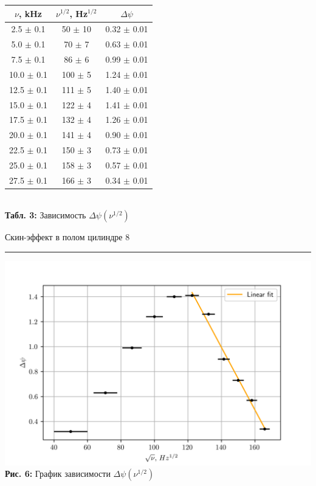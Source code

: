 \documentclass[12pt,a4paper]{scrartcl}
\begin{document}
	\begin{center}
		\begin{tabular}{|c|c|c|}
			\hline
			$\nu$, kHz & $\nu^{1/2}$, Hz$^{1/2}$ & $\Delta \psi$
			\\\hline
			2.5 $\pm$ 0.1 & 50 $\pm$ 10 & 0.32 $\pm$ 0.01
			\\\hline
			5.0 $\pm$ 0.1 & 70 $\pm$ 7 & 0.63 $\pm$ 0.01
			\\\hline
			7.5 $\pm$ 0.1 & 86 $\pm$ 6 & 0.99 $\pm$ 0.01
			\\\hline
			10.0 $\pm$ 0.1 & 100 $\pm$ 5 & 1.24 $\pm$ 0.01
			\\\hline
			12.5 $\pm$ 0.1 & 111 $\pm$ 5 & 1.40 $\pm$ 0.01
			\\\hline
			15.0 $\pm$ 0.1 & 122 $\pm$ 4 & 1.41 $\pm$ 0.01
			\\\hline
			17.5 $\pm$ 0.1 & 132 $\pm$ 4 & 1.26 $\pm$ 0.01
			\\\hline
			20.0 $\pm$ 0.1 & 141 $\pm$ 4 & 0.90 $\pm$ 0.01
			\\\hline
			22.5 $\pm$ 0.1 & 150 $\pm$ 3 & 0.73 $\pm$ 0.01
			\\\hline
			25.0 $\pm$ 0.1 & 158 $\pm$ 3 & 0.57 $\pm$ 0.01
			\\\hline
			27.5 $\pm$ 0.1 & 166 $\pm$ 3 & 0.34 $\pm$ 0.01
			\\\hline
		\end{tabular}
		\\\textbf{Табл. 3:} Зависимость $\Delta \psi(\nu^{1/2})$
	\end{center}
	
	
	\newpage
	
	\begin{flushleft}
		\footnotesize{Скин-эффект в полом цилиндре} \hspace{\fill} \footnotesize{8}
		\\[-0.3cm]\noindent\rule{\textwidth}{0.3pt}
	\end{flushleft}
	
	\begin{center}
		\includegraphics[scale=1]{PIC_6.png}
		\\\textbf{Рис. 6:} График зависимости $\Delta \psi(\nu^{1/2})$
	\end{center}
	
\end{document}
